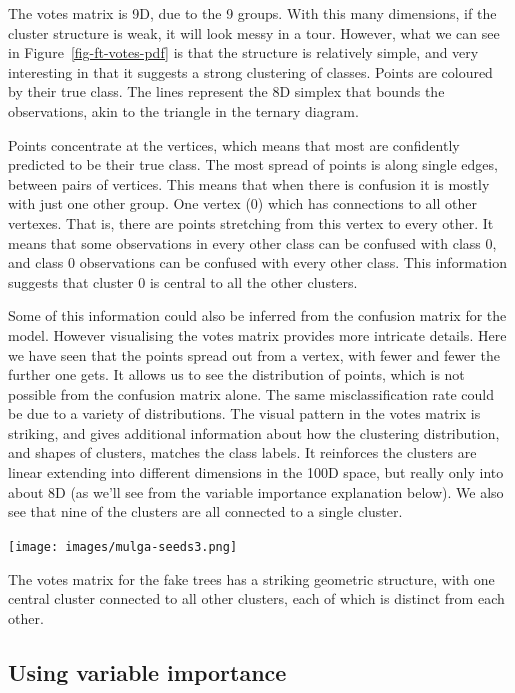 \documentclass[
  letterpaper,
]{krantz}
\newcommand{\insightbox}[1]{%
\noindent\colorbox{insight!30}{%
\begin{minipage}{0.98\textwidth}%
    \centering%
    \begin{minipage}[c]{0.15\textwidth} %
      \texttt{[image: images/mulga-seeds3.png]} %
    \end{minipage}%
    \hfill %
    \begin{minipage}[c]{0.8\textwidth} %
      \bigskip%
      \textsf{#1}%
      \bigskip%
    \end{minipage}%
    \hspace*{3mm}%
  \end{minipage}%
}%
}
\begin{document}
 The votes matrix is 9D, due to the 9 groups.
With this many dimensions, if the cluster structure is weak, it will
look messy in a tour. However, what we can see in
Figure~\ref{fig-ft-votes-pdf} is that the structure is relatively
simple, and very interesting in that it suggests a strong clustering of
classes. Points are coloured by their true class. The lines represent
the 8D simplex that bounds the observations, akin to the triangle in the
ternary diagram.

Points concentrate at the vertices, which means that most are
confidently predicted to be their true class. The most spread of points
is along single edges, between pairs of vertices. This means that when
there is confusion it is mostly with just one other group. One vertex
(0) which has connections to all other vertexes. That is, there are
points stretching from this vertex to every other. It means that some
observations in every other class can be confused with class 0, and
class 0 observations can be confused with every other class. This
information suggests that cluster 0 is central to all the other
clusters.

Some of this information could also be inferred from the confusion
matrix for the model. However visualising the votes matrix provides more
intricate details. Here we have seen that the points spread out from a
vertex, with fewer and fewer the further one gets. It allows us to see
the distribution of points, which is not possible from the confusion
matrix alone. The same misclassification rate could be due to a variety
of distributions. The visual pattern in the votes matrix is striking,
and gives additional information about how the clustering distribution,
and shapes of clusters, matches the class labels. It reinforces the
clusters are linear extending into different dimensions in the 100D
space, but really only into about 8D (as we'll see from the variable
importance explanation below). We also see that nine of the clusters are
all connected to a single cluster.

\insightbox{The votes matrix for the fake trees has a striking geometric structure, with one central cluster connected to all other clusters, each of which is distinct from each other.}

\subsection{Using variable importance}\label{sec-forest-var-imp}
\end{document}
